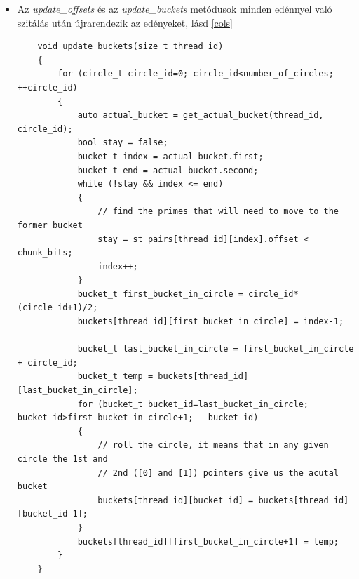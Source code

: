 \documentclass[twoside, a4paper, 12pt]{article}
\begin{document}
\begin{itemize}
\begin{lstlisting}
		for (size_t j=0; j<number_of_threads; ++j) // for all threads
		{
			buckets[j][0] = circles[0]; // the first bucket is equals to the first circle everytime
		
			size_t p = 0;
			size_t b = 1;
			for (circle_t circle_id=1; circle_id<number_of_circles; ++circle_id)
			{
				word_t temp = chunk_bits;
				for (bucket_t bucket_id=0; bucket_id<circle_id+1; ++bucket_id)
				{
					for (; p < circles[circle_id] && st_pairs[j][p].offset < temp; ++p) { }
					// iterate through the primes until either we reach the end of the current circle,
					// or the offset indicates that we won't sieve into the next bucket
					buckets[j][b++] = p-1;
					if (bucket_id != 0)
					{
						for (size_t i=buckets[j][b-1]+1; i<=buckets[j][b]; ++i)
						{
							st_pairs[j][i].offset -= chunk_bits; 
							// reset the offsets so we can roll the circles easier
						}
					}
					temp += chunk_bits;
				}
			}		
		}
	}
\end{lstlisting}
\item Az \textit{update\_offsets} és az \textit{update\_buckets} metódusok minden edénnyel való szitálás után újrarendezik az edényeket, lásd \ref{cols}
\begin{lstlisting}
	void update_buckets(size_t thread_id)
	{
		for (circle_t circle_id=0; circle_id<number_of_circles; ++circle_id)
		{
			auto actual_bucket = get_actual_bucket(thread_id, circle_id);
			bool stay = false;
			bucket_t index = actual_bucket.first;
			bucket_t end = actual_bucket.second;
			while (!stay && index <= end)
			{
				// find the primes that will need to move to the former bucket
				stay = st_pairs[thread_id][index].offset < chunk_bits;
				index++;
			}
			bucket_t first_bucket_in_circle = circle_id*(circle_id+1)/2;
			buckets[thread_id][first_bucket_in_circle] = index-1;
			
			bucket_t last_bucket_in_circle = first_bucket_in_circle + circle_id;
			bucket_t temp = buckets[thread_id][last_bucket_in_circle];
			for (bucket_t bucket_id=last_bucket_in_circle; bucket_id>first_bucket_in_circle+1; --bucket_id)
			{
				// roll the circle, it means that in any given circle the 1st and 
				// 2nd ([0] and [1]) pointers give us the acutal bucket
				buckets[thread_id][bucket_id] = buckets[thread_id][bucket_id-1];
			}
			buckets[thread_id][first_bucket_in_circle+1] = temp;
		}	
	}
\end{lstlisting}
\end{itemize}
\end{document}
